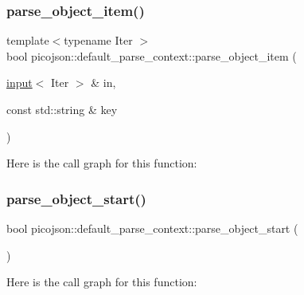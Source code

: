 \hypertarget{classpicojson_1_1default__parse__context_adf71929b098e4f4b5c32222af149655a}{}\label{classpicojson_1_1default__parse__context_adf71929b098e4f4b5c32222af149655a} 
\subsubsection{\texorpdfstring{parse\+\_\+object\+\_\+item()}{parse\_object\_item()}}
{\footnotesize\ttfamily template$<$typename Iter $>$ \\
bool picojson\+::default\+\_\+parse\+\_\+context\+::parse\+\_\+object\+\_\+item (\begin{DoxyParamCaption}\item[{\hyperlink{classpicojson_1_1input}{input}$<$ Iter $>$ \&}]{in,  }\item[{const std\+::string \&}]{key }\end{DoxyParamCaption})\hspace{0.3cm}{\ttfamily [inline]}}

Here is the call graph for this function\+:
\hypertarget{classpicojson_1_1default__parse__context_a54eba00b93ce4cdaf8b2acac4ef3e046}{}\label{classpicojson_1_1default__parse__context_a54eba00b93ce4cdaf8b2acac4ef3e046} 
\subsubsection{\texorpdfstring{parse\+\_\+object\+\_\+start()}{parse\_object\_start()}}
{\footnotesize\ttfamily bool picojson\+::default\+\_\+parse\+\_\+context\+::parse\+\_\+object\+\_\+start (\begin{DoxyParamCaption}{ }\end{DoxyParamCaption})\hspace{0.3cm}{\ttfamily [inline]}}

Here is the call graph for this function\+:
\hypertarget{classpicojson_1_1default__parse__context_a476c7d30a5cf382b48201ec64585c2f3}{}\label{classpicojson_1_1default__parse__context_a476c7d30a5cf382b48201ec64585c2f3} 
